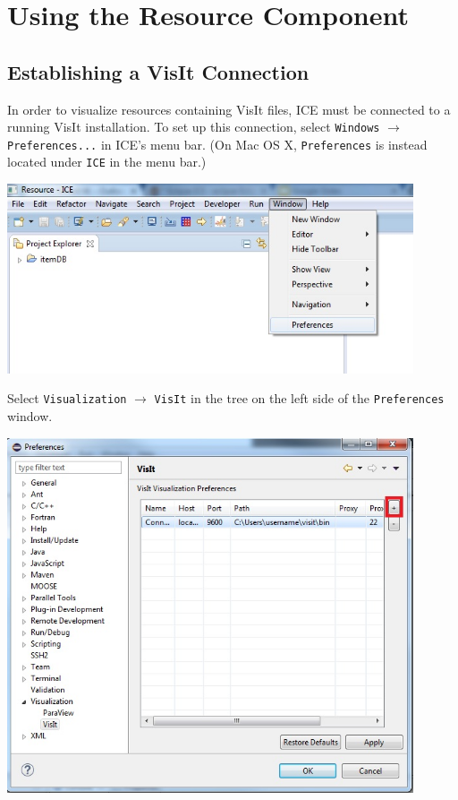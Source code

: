 \documentclass{article}
\begin{document}
\section{Using the Resource Component}

\subsection{Establishing a VisIt Connection}

In order to visualize resources containing VisIt files, ICE must be connected to
a running VisIt installation. To set up this connection, select \texttt{Windows}
$\rightarrow$ \texttt{Preferences...} in ICE's menu bar. (On Mac OS X,
\texttt{Preferences} is instead located under \texttt{ICE} in the menu
bar.)

\begin{center}
\includegraphics[width=12cm]{images/ICEPreferences}
\end{center}

Select \texttt{Visualization} $\rightarrow$ \texttt{VisIt} in the tree on the
left side of the \texttt{Preferences} window.

\begin{center}
\includegraphics[width=12cm]{images/VisualizationPreferences}
\end{center}
\end{document}
